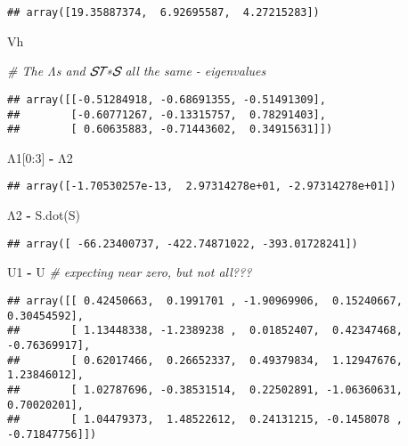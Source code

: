 \documentclass[]{article}
\newenvironment{Shaded}{\begin{snugshade}}{\end{snugshade}}
\newcommand{\CommentTok}[1]{\textcolor[rgb]{0.56,0.35,0.01}{\textit{#1}}}
\newcommand{\DecValTok}[1]{\textcolor[rgb]{0.00,0.00,0.81}{#1}}
\newcommand{\NormalTok}[1]{#1}
\newcommand{\OperatorTok}[1]{\textcolor[rgb]{0.81,0.36,0.00}{\textbf{#1}}}
\begin{document}
\begin{verbatim}
## array([19.35887374,  6.92695587,  4.27215283])
\end{verbatim}

\begin{Shaded}
\begin{Highlighting}[]
\NormalTok{Vh}

\CommentTok{# The Λs and 𝑆𝑇∗𝑆 all the same - eigenvalues}
\end{Highlighting}
\end{Shaded}

\begin{verbatim}
## array([[-0.51284918, -0.68691355, -0.51491309],
##        [-0.60771267, -0.13315757,  0.78291403],
##        [ 0.60635883, -0.71443602,  0.34915631]])
\end{verbatim}

\begin{Shaded}
\begin{Highlighting}[]
\NormalTok{Λ1[}\DecValTok{0}\NormalTok{:}\DecValTok{3}\NormalTok{] }\OperatorTok{-}\NormalTok{ Λ2}
\end{Highlighting}
\end{Shaded}

\begin{verbatim}
## array([-1.70530257e-13,  2.97314278e+01, -2.97314278e+01])
\end{verbatim}

\begin{Shaded}
\begin{Highlighting}[]
\NormalTok{Λ2 }\OperatorTok{-}\NormalTok{ S.dot(S)}
\end{Highlighting}
\end{Shaded}

\begin{verbatim}
## array([ -66.23400737, -422.74871022, -393.01728241])
\end{verbatim}

\begin{Shaded}
\begin{Highlighting}[]
\NormalTok{U1 }\OperatorTok{-}\NormalTok{ U }\CommentTok{# expecting near zero, but not all???}
\end{Highlighting}
\end{Shaded}

\begin{verbatim}
## array([[ 0.42450663,  0.1991701 , -1.90969906,  0.15240667,  0.30454592],
##        [ 1.13448338, -1.2389238 ,  0.01852407,  0.42347468, -0.76369917],
##        [ 0.62017466,  0.26652337,  0.49379834,  1.12947676,  1.23846012],
##        [ 1.02787696, -0.38531514,  0.22502891, -1.06360631,  0.70020201],
##        [ 1.04479373,  1.48522612,  0.24131215, -0.1458078 , -0.71847756]])
\end{verbatim}
\end{document}
